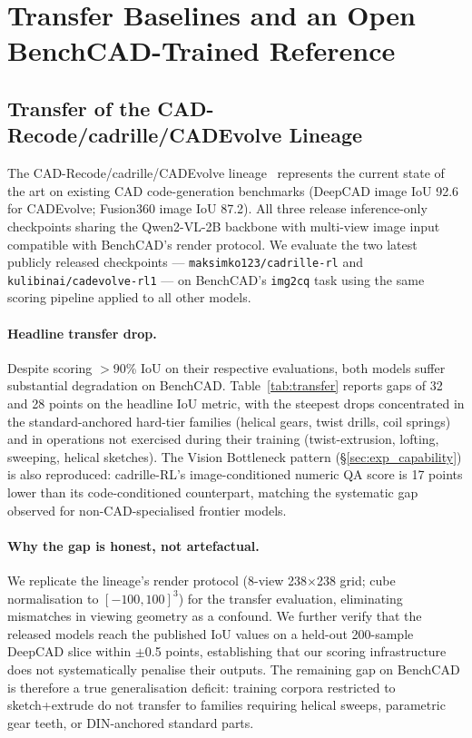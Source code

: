 \documentclass{article}
\begin{document}
\section{Transfer Baselines and an Open BenchCAD-Trained Reference}
\label{sec:transfer}

\subsection{Transfer of the CAD-Recode/cadrille/CADEvolve Lineage}
The CAD-Recode/cadrille/CADEvolve lineage~\citep{Rukhovich2025,Kolodiazhnyi2026,Elistratov2026} represents the current state of the art on existing CAD code-generation benchmarks (DeepCAD image IoU 92.6 for CADEvolve; Fusion360 image IoU 87.2). All three release inference-only checkpoints sharing the Qwen2-VL-2B backbone with multi-view image input compatible with BenchCAD's render protocol. We evaluate the two latest publicly released checkpoints --- \texttt{maksimko123/cadrille-rl} and \texttt{kulibinai/cadevolve-rl1} --- on BenchCAD's \texttt{img2cq} task using the same scoring pipeline applied to all other models.

\paragraph{Headline transfer drop.} Despite scoring $>$90\% IoU on their respective evaluations, both models suffer substantial degradation on BenchCAD. Table~\ref{tab:transfer} reports gaps of 32 and 28 points on the headline IoU metric, with the steepest drops concentrated in the standard-anchored hard-tier families (helical gears, twist drills, coil springs) and in operations not exercised during their training (twist-extrusion, lofting, sweeping, helical sketches). The Vision Bottleneck pattern (\S\ref{sec:exp_capability}) is also reproduced: cadrille-RL's image-conditioned numeric QA score is 17 points lower than its code-conditioned counterpart, matching the systematic gap observed for non-CAD-specialised frontier models.

\paragraph{Why the gap is honest, not artefactual.} We replicate the lineage's render protocol (8-view 238$\times$238 grid; cube normalisation to $[-100, 100]^3$) for the transfer evaluation, eliminating mismatches in viewing geometry as a confound. We further verify that the released models reach the published IoU values on a held-out 200-sample DeepCAD slice within $\pm$0.5 points, establishing that our scoring infrastructure does not systematically penalise their outputs. The remaining gap on BenchCAD is therefore a true generalisation deficit: training corpora restricted to sketch+extrude do not transfer to families requiring helical sweeps, parametric gear teeth, or DIN-anchored standard parts.
\end{document}
